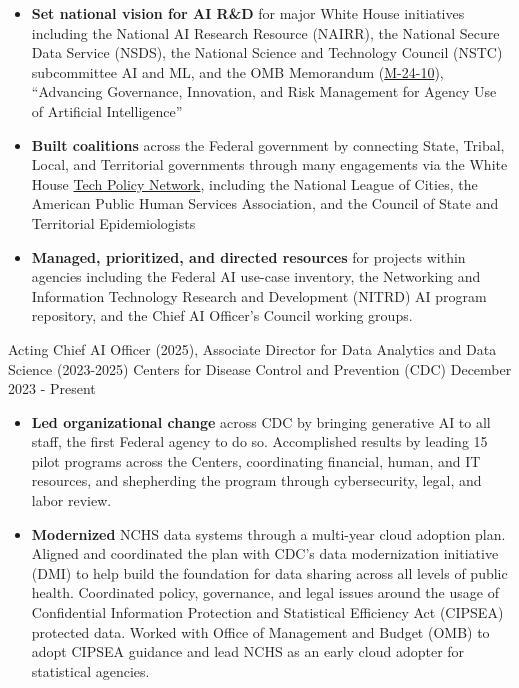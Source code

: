 \documentclass[]{scrartcl}
\begin{document}
\begin{cleanCV}
{\begin{itemize}
  \item \textbf{Set national vision for AI R\&D} for major White House initiatives including the National AI Research Resource (NAIRR), the National Secure Data Service (NSDS), the National Science and Technology Council (NSTC) subcommittee AI and ML, and the OMB Memorandum (\href{https://bidenwhitehouse.archives.gov/wp-content/uploads/2024/03/M-24-10-Advancing-Governance-Innovation-and-Risk-Management-for-Agency-Use-of-Artificial-Intelligence.pdf}{M-24-10}), ``Advancing Governance, Innovation, and Risk Management for Agency Use of Artificial Intelligence''
  \item \textbf{Built coalitions} across the Federal government by connecting State, Tribal, Local, and Territorial governments through many engagements via the White House \href{https://bidenwhitehouse.archives.gov/ostp/news-updates/2023/11/13/readout-of-roundtable-with-state-local-tribal-and-territorial-leaders-on-tech-policy/}{Tech Policy Network}, including the National League of Cities, the American Public Human Services Association, and the Council of State and Territorial Epidemiologists
  \item \textbf{Managed, prioritized, and directed resources} for projects within agencies including the Federal AI use-case inventory, the Networking and Information Technology Research and Development (NITRD) AI program repository, and the Chief AI Officer's Council working groups.

  \end{itemize}
}
\newpage

\WorkExperience
{}
{Acting Chief AI Officer (2025), \newline
Associate Director for Data Analytics and Data Science (2023-2025)}
{
  \newline Centers for Disease Control and Prevention (CDC)
  \newline December 2023 - Present
}
{
  \vspace{-0.25em}
  \begin{itemize}

  \item \textbf{Led organizational change} across CDC by bringing generative AI to all staff, the first Federal agency to do so. Accomplished results by leading 15 pilot programs across the Centers, coordinating financial, human, and IT resources, and shepherding the program through cybersecurity, legal, and labor review.

  \item \textbf{Modernized} NCHS data systems through a multi-year cloud adoption plan. Aligned and coordinated the plan with CDC's data modernization initiative (DMI) to help build the foundation for data sharing across all levels of public health. Coordinated policy, governance, and legal issues around the usage of Confidential Information Protection and Statistical Efficiency Act (CIPSEA) protected data. Worked with Office of Management and Budget (OMB) to adopt CIPSEA guidance and lead NCHS as an early cloud adopter for statistical agencies.
    

\end{itemize}}
\end{cleanCV}
\end{document}
